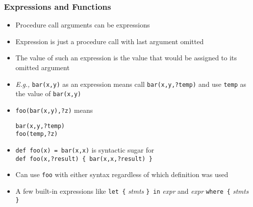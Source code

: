 \documentclass[12pt]{beamer}
\begin{document}
\begin{frame}[fragile]
\frametitle{Expressions and Functions}
\begin{itemize}
\item Procedure call arguments can be expressions
\item Expression is just a procedure call with last argument omitted
\item The value of such an expression is the value that would be assigned
  to its omitted argument
\item \emph{E.g.,} \texttt{bar(x,y)} as an expression means call
  \texttt{bar(x,y,?temp)} and use \texttt{temp} as the value of
  \texttt{bar(x,y)}
\item \texttt{foo(bar(x,y),?z)} \quad means \quad
  \begin{minipage}[c]{0.4\linewidth}
  \texttt{bar(x,y,?temp)} \\
  \texttt{foo(temp,?z)}
  \end{minipage}
\item \texttt{def foo(x) = bar(x,x)} is syntactic sugar for \\
\texttt{def foo(x,?result) \{ bar(x,x,?result) \}}
\item Can use \texttt{foo} with either syntax regardless of which
  definition was used
\item A few built-in expressions like \texttt{let \{} \emph{stmts}
  \texttt{\} in} \emph{expr} and \emph{expr} \texttt{where \{} \emph{stmts}
  \texttt{\}}
\end{itemize}
\end{frame}
\end{document}

